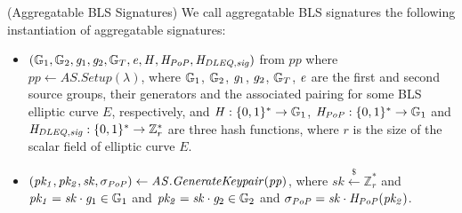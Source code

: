\begin{construction}(Aggregatable BLS Signatures) We call aggregatable BLS signatures the following instantiation of aggregatable signatures:
\label{insta_bls}
\begin{itemize}

\item $(\mathbb{G}_{1}, \mathbb{G}_{2},  \mathit{g}_{1}, \mathit{g}_{2}, \mathbb{G}_{T}, \mathit{e}, \mathit{H}, \mathit{H}_{\mathit{PoP}}, \mathit{H}_{\mathit{DLEQ}, \mathit{sig}})$ from $\mathit{pp}$ where \\ 
$\mathit{pp} \leftarrow  \mathit{AS.Setup}(\lambda)$, 
where $\mathbb{G}_{1}$, $\mathbb{G}_{2}$,  $\mathit{g}_{1}$, $\mathit{g}_{2}$, $\mathbb{G}_{T}$, $\mathit{e}$ are the first and second source groups, 
their generators and the associated pairing for some BLS elliptic curve $E$, respectively,  
and $\mathit{H}: \{0,1\}^* \rightarrow \mathbb{G}_{1}$, $\mathit{H}_{\mathit{PoP}}: \{0,1\}^* \rightarrow \mathbb{G}_{1}$ 
and $\mathit{H}_{\mathit{DLEQ}, \mathit{sig}}: \{0,1\}^* \rightarrow \mathbb{Z}_r^*$ are three hash functions, where $r$ is the size of the scalar field of elliptic curve $E$. 


\item $(\mathit{pk_1}, \mathit{pk_2}, \mathit{sk}, \sigma_{\mathit{PoP}}) \leftarrow \mathit{AS.GenerateKeypair}(\mathit{pp})$, 
where $\mathit{sk} \xleftarrow{\$} \mathbb{Z}_{r}^{*}$ and $\mathit{pk_1} = \mathit{sk} \cdot \mathit{g}_{1} \in \mathbb{G}_{1}$ 
and $\mathit{pk_2} = \mathit{sk} \cdot \mathit{g}_{2} \in \mathbb{G}_{2}$ and 
$\sigma_{\mathit{PoP}} = \mathit{sk} \cdot \mathit{H}_{\mathit{PoP}}(\mathit{pk_2})$. 


\end{itemize}
\end{construction}
